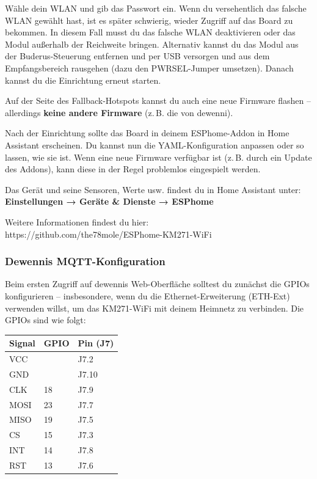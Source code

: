 \documentclass[
  9pt,
]{extarticle}
\makeatletter
\newcommand*\pandocbounded[1]{%
  \sbox\pandoc@box{#1}%
  \Gscale@div\@tempa{\textheight}{\dimexpr\ht\pandoc@box+\dp\pandoc@box\relax}%
  \Gscale@div\@tempb{\linewidth}{\wd\pandoc@box}%
  \ifdim\@tempb\p@<\@tempa\p@\let\@tempa\@tempb\fi%
  \ifdim\@tempa\p@<\p@\scalebox{\@tempa}{\usebox\pandoc@box}%
  \else\usebox{\pandoc@box}%
  \fi%
}
\makeatother
\begin{document}
Wähle dein WLAN und gib das Passwort ein. Wenn du versehentlich das
falsche WLAN gewählt hast, ist es später schwierig, wieder Zugriff auf
das Board zu bekommen. In diesem Fall musst du das falsche WLAN
deaktivieren oder das Modul außerhalb der Reichweite bringen. Alternativ
kannst du das Modul aus der Buderus-Steuerung entfernen und per USB
versorgen und aus dem Empfangsbereich rausgehen (dazu den PWRSEL-Jumper
umsetzen). Danach kannst du die Einrichtung erneut starten.

Auf der Seite des Fallback-Hotspots kannst du auch eine neue Firmware
flashen -- allerdings \textbf{keine andere Firmware} (z.\,B. die von
dewenni).

Nach der Einrichtung sollte das Board in deinem ESPhome-Addon in Home
Assistant erscheinen. Du kannst nun die YAML-Konfiguration anpassen oder
so lassen, wie sie ist. Wenn eine neue Firmware verfügbar ist (z.\,B.
durch ein Update des Addons), kann diese in der Regel problemlos
eingespielt werden.

Das Gerät und seine Sensoren, Werte usw. findest du in Home Assistant
unter:\\
\textbf{Einstellungen → Geräte \& Dienste → ESPhome}

Weitere Informationen findest du hier:\\
https://github.com/the78mole/ESPhome-KM271-WiFi

\href{https://github.com/the78mole/ESPhome-KM271-WiFi}{\pandocbounded{\texttt{[image: https://api.qrserver.com/v1/create-qr-code/?data=https\\\%3A\\\%2F\\\%2Fgithub.com\\\%2Fthe78mole\\\%2FESPhome-KM271-WiFi\&size=150x150]}}}

\subsubsection{Dewennis
MQTT-Konfiguration}\label{dewennis-mqtt-konfiguration}

Beim ersten Zugriff auf dewennis Web-Oberfläche solltest du zunächst die
GPIOs konfigurieren -- insbesondere, wenn du die Ethernet-Erweiterung
(ETH-Ext) verwenden willst, um das KM271-WiFi mit deinem Heimnetz zu
verbinden. Die GPIOs sind wie folgt:

\begin{longtable}[]{@{}lll@{}}
\toprule\noalign{}
Signal & GPIO & Pin (J7) \\
\midrule\noalign{}
\endhead
\bottomrule\noalign{}
\endlastfoot
VCC & & J7.2 \\
GND & & J7.10 \\
CLK & 18 & J7.9 \\
MOSI & 23 & J7.7 \\
MISO & 19 & J7.5 \\
CS & 15 & J7.3 \\
INT & 14 & J7.8 \\
RST & 13 & J7.6 \\
\end{longtable}
\end{document}
